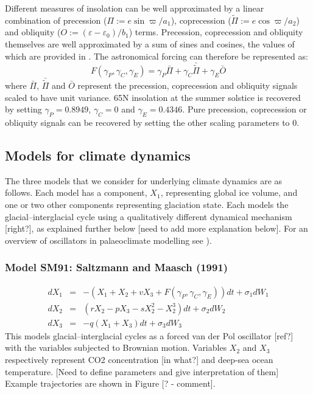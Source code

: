 \documentclass[a4paper,12pt]{article}
\begin{document}
Different measures of insolation can be well approximated by a linear combination of precession ($\Pi := e\sin \varpi / a_1$), coprecession ($\tilde{\Pi} := e\cos \varpi / a_2$) and obliquity ($O := (\varepsilon - \varepsilon_0)/b_1$) terms.
Precession, coprecession and obliquity themselves are well approximated by a sum of sines and cosines, the values of which are provided in \cite{Berger1978a}.
The astronomical forcing can therefore be represented as:
\begin{equation}
F(\gamma_P,\gamma_C,\gamma_E) = \gamma_P \bar{\Pi} + \gamma_C \bar{\tilde{\Pi}} +\gamma_E \bar{O}
\end{equation}
\noindent where $\bar{\Pi}$, $\bar{\tilde{\Pi}}$ and $\bar{O}$ represent the precession, coprecession and obliquity signals scaled to have unit variance.
65\textdegree N insolation at the summer solstice is recovered by setting $\gamma_P=0.8949$, $\gamma_C=0$ and $\gamma_E=0.4346$.
Pure precession, coprecession or obliquity signals can be recovered by setting the other scaling parameters to 0.

\subsection{Models for climate dynamics}

The three models that we consider for underlying climate dynamics are as follows.  Each
model has a component, $X_1$, representing global ice volume, and one or two other
components representing glaciation state.  Each models the glacial--interglacial cycle
using a qualitatively different dynamical mechanism [right?], as explained further below 
[need to add more explanation below].  For an overview of oscillators in palaeoclimate modelling see
\cite{Crucifix2012}).

\subsubsection*{Model SM91: Saltzmann and Maasch (1991)}
\begin{eqnarray*}
dX_1 & = & -\left( X_1 + X_2 + v X_3 + F(\gamma_P,\gamma_C,\gamma_E) \right)dt + \sigma_1 dW_1 \\
dX_2 & = & \left( r X_2 - p X_3 - s X_2^2 - X_2^3 \right)dt + \sigma_2 dW_2 \\
dX_3 & = & -q \left( X_1 + X_3 \right) dt + \sigma_3 dW_3
\end{eqnarray*}
This models glacial--interglacial cycles as a forced van der Pol oscillator [ref?] with the
variables subjected to Brownian motion.  Variables $X_2$ and $X_3$ respectively represent 
CO2 concentration [in
what?] and deep-sea ocean temperature.  [Need to define parameters and give interpretation of them] Example trajectories are shown in Figure [? - comment].
\end{document}
